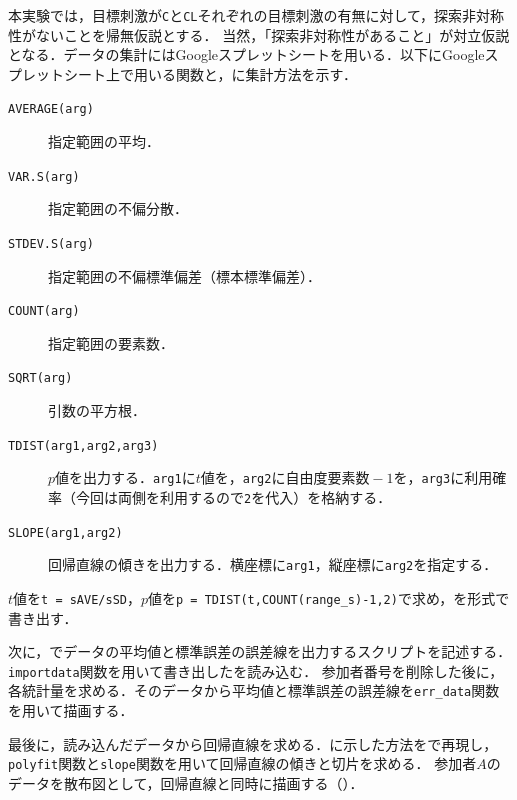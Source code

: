 本実験では，目標刺激が\texttt{C}と\texttt{CL}それぞれの目標刺激の有無に対して，探索非対称性がないことを帰無仮説とする．
当然，「探索非対称性があること」が対立仮説となる．データの集計にはGoogleスプレットシートを用いる．以下にGoogleスプレットシート上で用いる関数と，に集計方法を示す．
\begin{multicols}{2}
    \begin{description}
        \item[\texttt{AVERAGE(arg)}] 指定範囲の平均．
        \item[\texttt{VAR.S(arg)}] 指定範囲の不偏分散．
        \item[\texttt{STDEV.S(arg)}] 指定範囲の不偏標準偏差（標本標準偏差）．
        \item[\texttt{COUNT(arg)}] 指定範囲の要素数．
        \item[\texttt{SQRT(arg)}] 引数の平方根．
        \item[\texttt{TDIST(arg1,arg2,arg3)}] \(p\)値を出力する．\texttt{arg1}に\(t\)値を，\texttt{arg2}に自由度\(\textrm{要素数}-1\)を，\texttt{arg3}に利用確率（今回は両側を利用するので\texttt{2}を代入）を格納する．
        \item[\texttt{SLOPE(arg1,arg2)}] 回帰直線の傾きを出力する．横座標に\texttt{arg1}，縦座標に\texttt{arg2}を指定する．
    \end{description}
\end{multicols}

\(t\)値を\texttt{t = sAVE/sSD}，\(p\)値を\texttt{p = TDIST(t,COUNT(range\_s)-1,2)}で求め，を\csv 形式で書き出す．\par
次に，\matlab でデータの平均値と標準誤差の誤差線を出力するスクリプトを記述する．\texttt{importdata}関数を用いて書き出した\csv を読み込む．
参加者番号を削除した後に，各統計量を求める．そのデータから平均値と標準誤差の誤差線を\texttt{err\_data}関数を用いて描画する．\par
最後に，読み込んだデータから回帰直線を求める．に示した方法を\matlab で再現し，\texttt{polyfit}関数と\texttt{slope}関数を用いて回帰直線の傾きと切片を求める．
参加者\(A\)のデータを散布図として，回帰直線と同時に描画する（）．
